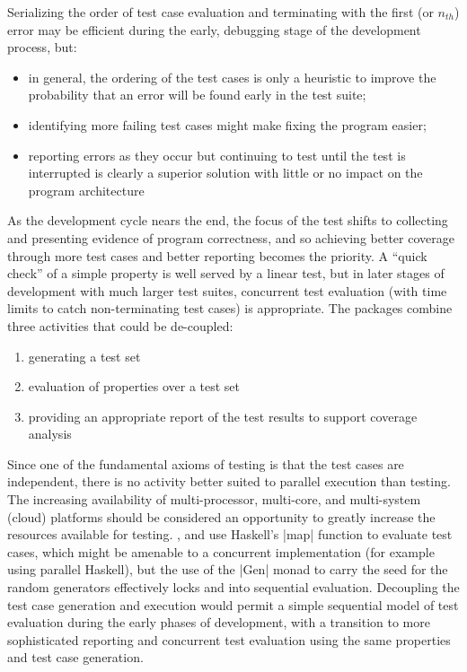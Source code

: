 Serializing the order of test case evaluation and 
terminating with the first (or $n_{th}$) error
may be efficient during the early, debugging stage of  the development process,
but:

\begin{itemize}
\item in general, the ordering of the test cases is only a heuristic
to improve the probability that an error will be found early in the test suite;
\item identifying more failing test cases might make fixing the program easier;
\item reporting errors as they occur but continuing to test
until the test is interrupted is clearly a superior solution with little or no impact on the program architecture
\end{itemize}

As the development cycle nears the end,
the focus of the test shifts to collecting and presenting evidence of program correctness,
and so achieving better coverage through more test cases and better reporting becomes the priority.
A ``quick check'' of a simple property is well served by a linear test,
but in later stages of development with much larger test suites,
concurrent test evaluation (with time limits to catch non-terminating test cases) is appropriate.
The packages combine three activities that could be de-coupled:

\begin{enumerate}
\item generating a test set
\item evaluation of properties over a test set
\item providing an appropriate report of the test results to support coverage analysis
\end{enumerate}

\noindent
Since one of the fundamental axioms of testing is that the test cases are independent,
there is no activity better suited to parallel execution than testing.
The increasing availability of multi-processor, multi-core, and multi-system (cloud) platforms
should be considered an opportunity to greatly increase the resources available for testing.
\SC, \GAST and \FEAT use Haskell's |map| function to evaluate test cases,
which might be amenable to a concurrent implementation 
(for example using parallel Haskell),
but the use of the |Gen| monad to carry the seed for the random generators
effectively locks \QC and \FEAT into sequential evaluation.
Decoupling the test case generation and execution would permit
a simple sequential model of test evaluation during the early phases of development,
with a transition to more sophisticated reporting and concurrent test evaluation
using the same properties and test case generation.

